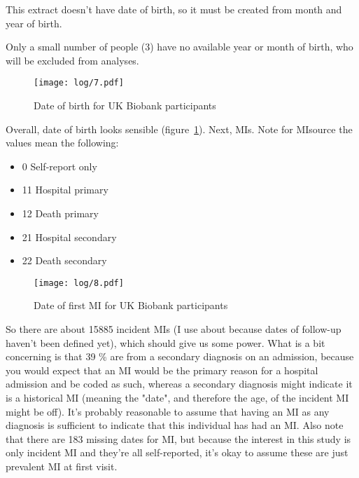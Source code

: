 \documentclass[11pt]{article}
\begin{document}
This extract doesn't have date of birth, so it must be created from month and year of birth. 

\color{Blue4}
\begin{stlog}\end{stlog}
\begin{stlog}\end{stlog}
\color{black}

Only a small number of people (3) have no available year or month of birth, who will be excluded from analyses. 

\color{Blue4}
\begin{figure}
    \centering
    \texttt{[image: log/7.pdf]}
    \caption{Date of birth for UK Biobank participants}
    \label{DOBhist}
\end{figure}
\begin{stlog}\end{stlog}
\color{black}

Overall, date of birth looks sensible (figure~\ref{DOBhist}).
Next, MIs.
Note for MIsource the values mean the following:
\begin{itemize}
\item 0 Self-report only
\item 11 Hospital primary
\item 12 Death primary
\item 21 Hospital secondary
\item 22 Death secondary
\end{itemize}

\color{Blue4}
\begin{figure}
    \centering
    \texttt{[image: log/8.pdf]}
    \caption{Date of first MI for UK Biobank participants}
    \label{MIhist}
\end{figure}
\begin{stlog}\end{stlog}
\color{black}

So there are about 15885 incident MIs (I use about because dates of follow-up haven't been defined yet), 
which should give us some power. What is a bit concerning is that 39 \% are from a secondary diagnosis on an admission, 
because you would expect that an MI would be the primary reason for a hospital admission and be coded as such, 
whereas a secondary diagnosis might indicate it is a historical MI (meaning the "date", and therefore the age, of the incident MI might be off).
It's probably reasonable to assume that having an MI as any diagnosis is sufficient to indicate that this individual 
has had an MI.
Also note that there are 183 missing dates for MI, but because the interest in this study is only incident MI and
they're all self-reported, it's okay to assume these are just prevalent MI at first visit. 
\end{document}
